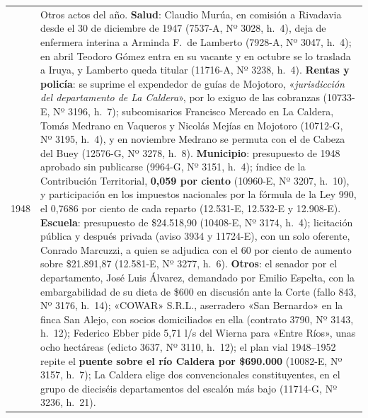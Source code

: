 \begin{longtable}{@{}p{2.7cm}p{10.3cm}@{}}
1948 & Otros actos del año. \textbf{Salud}: Claudio Murúa, en comisión a Rivadavia desde el 30 de diciembre de 1947 (7537-A, Nº 3028, h.\ 4), deja de enfermera interina a Arminda F.\ de Lamberto (7928-A, Nº 3047, h.\ 4); en abril Teodoro Gómez entra en su vacante y en octubre se lo traslada a Iruya, y Lamberto queda titular (11716-A, Nº 3238, h.\ 4). \textbf{Rentas y policía}: se suprime el expendedor de guías de Mojotoro, «\textit{jurisdicción del departamento de La Caldera}», por lo exiguo de las cobranzas (10733-E, Nº 3196, h.\ 7); subcomisarios Francisco Mercado en La Caldera, Tomás Medrano en Vaqueros y Nicolás Mejías en Mojotoro (10712-G, Nº 3195, h.\ 4), y en noviembre Medrano se permuta con el de Cabeza del Buey (12576-G, Nº 3278, h.\ 8). \textbf{Municipio}: presupuesto de 1948 aprobado sin publicarse (9964-G, Nº 3151, h.\ 4); índice de la Contribución Territorial, \textbf{0,059 por ciento} (10960-E, Nº 3207, h.\ 10), y participación en los impuestos nacionales por la fórmula de la Ley 990, el 0,7686 por ciento de cada reparto (12.531-E, 12.532-E y 12.908-E). \textbf{Escuela}: presupuesto de \$24.518,90 (10408-E, Nº 3174, h.\ 4); licitación pública y después privada (aviso 3934 y 11724-E), con un solo oferente, Conrado Marcuzzi, a quien se adjudica con el 60 por ciento de aumento sobre \$21.891,87 (12.581-E, Nº 3277, h.\ 6). \textbf{Otros}: el senador por el departamento, José Luis Álvarez, demandado por Emilio Espelta, con la embargabilidad de su dieta de \$600 en discusión ante la Corte (fallo 843, Nº 3176, h.\ 14); «COWAR» S.R.L., aserradero «San Bernardo» en la finca San Alejo, con socios domiciliados en ella (contrato 3790, Nº 3143, h.\ 12); Federico Ebber pide 5,71 l/s del Wierna para «Entre Ríos», unas ocho hectáreas (edicto 3637, Nº 3110, h.\ 12); el plan vial 1948--1952 repite el \textbf{puente sobre el río Caldera por \$690.000} (10082-E, Nº 3157, h.\ 7); La Caldera elige dos convencionales constituyentes, en el grupo de dieciséis departamentos del escalón más bajo (11714-G, Nº 3236, h.\ 21). \\

\end{longtable}
